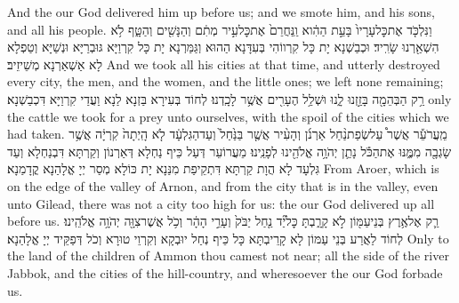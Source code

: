 {And the \lord\space our God delivered him up before us; and we smote him, and his sons, and all his people.}{}
{וַנִּלְכֹּ֤ד אֶת\maqqaf כׇּל\maqqaf עָרָיו֙ בָּעֵ֣ת הַהִ֔וא וַֽנַּחֲרֵם֙ אֶת\maqqaf כׇּל\maqqaf עִ֣יר מְתִ֔ם וְהַנָּשִׁ֖ים וְהַטָּ֑ף לֹ֥א הִשְׁאַ֖רְנוּ שָׂרִֽיד׃}
{וּכְבַשְׁנָא יָת כָּל קִרְווֹהִי בְּעִדָּנָא הַהוּא וְגַּמַּרְנָא יָת כָּל קִרְוַיָּא גּוּבְרַיָּא וּנְשַׁיָּא וְטַפְלָא לָא אַשְׁאַרְנָא מְשֵׁיזֵיב׃}
{And we took all his cities at that time, and utterly destroyed every city, the men, and the women, and the little ones; we left none remaining;}{}
{רַ֥ק הַבְּהֵמָ֖ה בָּזַ֣זְנוּ לָ֑נוּ וּשְׁלַ֥ל הֶעָרִ֖ים אֲשֶׁ֥ר לָכָֽדְנוּ׃}
{לְחוֹד בְּעִירָא בַּזְנָא לַנָא וַעֲדַי קִרְוַיָּא דִּכְבַשְׁנָא׃}
{only the cattle we took for a prey unto ourselves, with the spoil of the cities which we had taken.}{}
{מֵֽעֲרֹעֵ֡ר אֲשֶׁר֩ עַל\maqqaf שְׂפַת\maqqaf נַ֨חַל אַרְנֹ֜ן וְהָעִ֨יר אֲשֶׁ֤ר בַּנַּ֙חַל֙ וְעַד\maqqaf הַגִּלְעָ֔ד לֹ֤א הָֽיְתָה֙ קִרְיָ֔ה אֲשֶׁ֥ר שָׂגְבָ֖ה מִמֶּ֑נּוּ אֶת\maqqaf הַכֹּ֕ל נָתַ֛ן יְהֹוָ֥ה אֱלֹהֵ֖ינוּ לְפָנֵֽינוּ׃}
{מֵעֲרוֹעֵר דְּעַל כֵּיף נַחְלָא דְּאַרְנוֹן וְקַרְתָּא דִּבְנַחְלָא וְעַד גִּלְעָד לָא הֲוָת קַרְתָּא דִּתְקֵיפַת מִנַּנָא יָת כּוֹלָא מְסַר יְיָ אֱלָהַנָא קֳדָמַנָא׃}
{From Aroer, which is on the edge of the valley of Arnon, and from the city that is in the valley, even unto Gilead, there was not a city too high for us: the \lord\space our God delivered up all before us.}{}
{רַ֛ק אֶל\maqqaf אֶ֥רֶץ בְּנֵי\maqqaf עַמּ֖וֹן לֹ֣א קָרָ֑בְתָּ כׇּל\maqqaf יַ֞ד נַ֤חַל יַבֹּק֙ וְעָרֵ֣י הָהָ֔ר וְכֹ֥ל אֲשֶׁר\maqqaf צִוָּ֖ה יְהֹוָ֥ה אֱלֹהֵֽינוּ׃}
{לְחוֹד לַאֲרַע בְּנֵי עַמּוֹן לָא קָרֵיבְתָּא כָּל כֵּיף נְחַל יוּבְקָא וְקִרְוֵי טוּרָא וְכֹל דְּפַקֵּיד יְיָ אֱלָהַנָא׃}
{Only to the land of the children of Ammon thou camest not near; all the side of the river Jabbok, and the cities of the hill-country, and wheresoever the \lord\space our God forbade us.}{}
